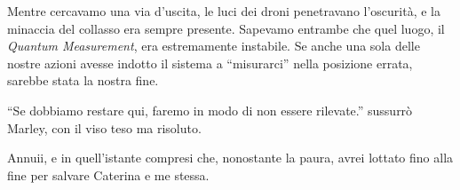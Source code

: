 \begin{center}
\begin{minipage}{0.7\textwidth}
    \centering
\end{minipage}
\end{center}

Mentre cercavamo una via d'uscita, le luci dei droni penetravano l'oscurità, e la minaccia del collasso era sempre presente. Sapevamo entrambe che quel luogo, il \textit{Quantum Measurement}, era estremamente instabile. Se anche una sola delle nostre azioni avesse indotto il sistema a \enquote{misurarci} nella posizione errata, sarebbe stata la nostra fine.

\begin{dialogue}
 ``Se dobbiamo restare qui, faremo in modo di non essere rilevate.'' sussurrò Marley, con il viso teso ma risoluto.
\end{dialogue}
 Annuii, e in quell'istante compresi che, nonostante la paura, avrei lottato fino alla fine per salvare Caterina e me stessa.

